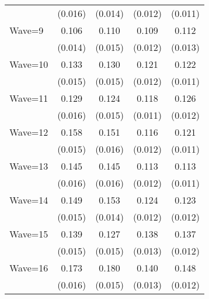 {\begin{tabular}{l*{4}{c}}
                    &     (0.016)         &     (0.014)         &     (0.012)         &     (0.011)         \\
[1em]
Wave=9              &       0.106\sym{***}&       0.110\sym{***}&       0.109\sym{***}&       0.112\sym{***}\\
                    &     (0.014)         &     (0.015)         &     (0.012)         &     (0.013)         \\
[1em]
Wave=10             &       0.133\sym{***}&       0.130\sym{***}&       0.121\sym{***}&       0.122\sym{***}\\
                    &     (0.015)         &     (0.015)         &     (0.012)         &     (0.011)         \\
[1em]
Wave=11             &       0.129\sym{***}&       0.124\sym{***}&       0.118\sym{***}&       0.126\sym{***}\\
                    &     (0.016)         &     (0.015)         &     (0.011)         &     (0.012)         \\
[1em]
Wave=12             &       0.158\sym{***}&       0.151\sym{***}&       0.116\sym{***}&       0.121\sym{***}\\
                    &     (0.015)         &     (0.016)         &     (0.012)         &     (0.011)         \\
[1em]
Wave=13             &       0.145\sym{***}&       0.145\sym{***}&       0.113\sym{***}&       0.113\sym{***}\\
                    &     (0.016)         &     (0.016)         &     (0.012)         &     (0.011)         \\
[1em]
Wave=14             &       0.149\sym{***}&       0.153\sym{***}&       0.124\sym{***}&       0.123\sym{***}\\
                    &     (0.015)         &     (0.014)         &     (0.012)         &     (0.012)         \\
[1em]
Wave=15             &       0.139\sym{***}&       0.127\sym{***}&       0.138\sym{***}&       0.137\sym{***}\\
                    &     (0.015)         &     (0.015)         &     (0.013)         &     (0.012)         \\
[1em]
Wave=16             &       0.173\sym{***}&       0.180\sym{***}&       0.140\sym{***}&       0.148\sym{***}\\
                    &     (0.016)         &     (0.015)         &     (0.013)         &     (0.012)         \\

\end{tabular}}
